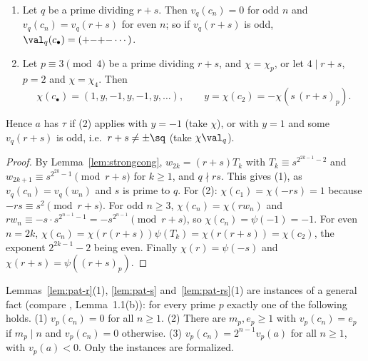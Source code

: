 \begin{lemma}[Primes of $r + s$]
  \label{lem:pat-rs}
  \leanok
  \begin{enumerate}
    \item Let $q$ be a prime dividing $r + s$. Then $v_q(c_n) = 0$ for odd $n$ and
          $v_q(c_n) = v_q(r + s)$ for even $n$; so if $v_q(r + s)$ is odd,
          $\val_q(c_\bullet) = ({+}{-}{+}{-}\cdots)$.
    \item Let $p \equiv 3 \pmod 4$ be a prime dividing $r + s$, and $\chi = \chi_p$, or let
          $4 \mid r + s$, $p = 2$ and $\chi = \chi_4$. Then
          \[ \chi(c_\bullet) = (1, y, -1, y, -1, y, \dots), \qquad
             y = \chi(c_2) = -\chi(s\,(r + s)_p). \]
  \end{enumerate}
  Hence $a$ has $\tau$ if (2) applies with $y = -1$ (take $\chi$), or with $y = 1$ and some
  $v_q(r + s)$ is odd, i.e.\ $r + s \ne \pm\sq$ (take $\chi \val_q$).
\end{lemma}
\begin{proof}
  \leanok
  By Lemma~\ref{lem:strongcong}, $w_{2k} = (r + s) T_k$ with $T_k \equiv s^{2^{2k-1} - 2}$ and
  $w_{2k+1} \equiv s^{2^{2k} - 1} \pmod{r + s}$ for $k \ge 1$, and $q \nmid rs$. This gives (1),
  as $v_q(c_n) = v_q(w_n)$ and $s$ is prime to $q$. For (2): $\chi(c_1) = \chi(-rs) = 1$ because
  $-rs \equiv s^2 \pmod{r + s}$. For odd $n \ge 3$, $\chi(c_n) = \chi(r w_n)$ and
  $r w_n \equiv -s \cdot s^{2^{n-1} - 1} = -s^{2^{n-1}} \pmod{r + s}$, so $\chi(c_n) = \psi(-1) = -1$.
  For even $n = 2k$, $\chi(c_n) = \chi(r (r + s))\psi(T_k) = \chi(r(r+s)) = \chi(c_2)$, the exponent
  $2^{2k-1} - 2$ being even. Finally $\chi(r) = \psi(-s)$ and $\chi(r + s) = \psi((r + s)_p)$.
\end{proof}

\begin{remark}
  \label{rem:vp}
  Lemmas~\ref{lem:pat-r}(1), \ref{lem:pat-s} and~\ref{lem:pat-rs}(1) are instances of a general
  fact (compare \cite{paper}, Lemma~1.1(b)): for every prime $p$ exactly one of the following holds.
  (1) $v_p(c_n) = 0$ for all $n \ge 1$. (2) There are $m_p, e_p \ge 1$ with $v_p(c_n) = e_p$ if
  $m_p \mid n$ and $v_p(c_n) = 0$ otherwise. (3) $v_p(c_n) = 2^{n-1} v_p(a)$ for all $n \ge 1$, with
  $v_p(a) < 0$. Only the instances are formalized.
\end{remark}

